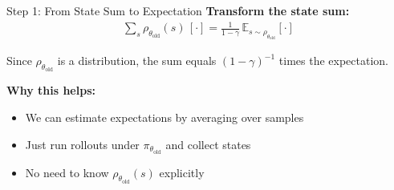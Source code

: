 \documentclass[aspectratio=169]{beamer}
\newcommand{\E}{\mathbb{E}}
\newcommand{\told}{\theta_{\mathrm{old}}}
\begin{document}
\begin{frame}[label=sampling-details-2]{Step 1: From State Sum to Expectation}
  \textbf{Transform the state sum:}
  \begin{gather*}
    \sum_s \rho_{\told}(s)\,[\cdot] = \frac{1}{1-\gamma}\,\E_{s\sim\rho_{\told}}[\cdot]
  \end{gather*}

  \vspace{8pt}
  {\small Since $\rho_{\told}$ is a distribution, the sum equals $(1-\gamma)^{-1}$ times the expectation.}

  \vspace{12pt}
  \textbf{Why this helps:}
  \begin{itemize}
    \item We can estimate expectations by averaging over samples
    \item Just run rollouts under $\pi_{\told}$ and collect states
    \item No need to know $\rho_{\told}(s)$ explicitly
  \end{itemize}


  \vspace{8pt}
  \centering
  \hyperlink{sampling-main}{}

\end{frame}

\end{document}
